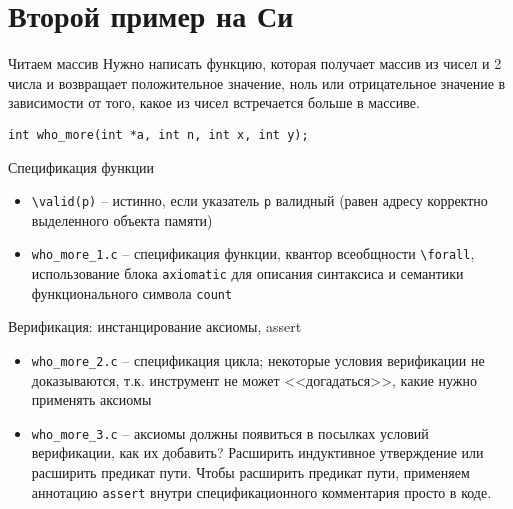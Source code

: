 \documentclass[hyperref={unicode=true}]{beamer}
\begin{document}
    \section{Второй пример на Си}
    \begin{frame}{Читаем массив}
    Нужно написать функцию, которая получает массив из чисел и 2 числа и возвращает положительное значение, ноль или отрицательное значение в зависимости от того, какое из чисел встречается больше в массиве.

    \texttt{int who\_more(int *a, int n, int x, int y);}
    \end{frame}

    \begin{frame}{Спецификация функции}
    \begin{itemize}
    \item \texttt{\textbackslash valid(p)} -- истинно, если указатель \texttt{p} валидный (равен адресу корректно выделенного объекта памяти)
    \item \texttt{who\_more\_1.c} -- спецификация функции, квантор всеобщности \texttt{\textbackslash forall}, использование блока \texttt{axiomatic} для описания синтаксиса и семантики функционального символа \texttt{count}
    \end{itemize}
    \end{frame}

    \begin{frame}{Верификация: инстанцирование аксиомы, assert}
    \begin{itemize}
    \item \texttt{who\_more\_2.c} -- спецификация цикла; некоторые условия верификации не доказываются, т.к. инструмент не может <<догадаться>>, какие нужно применять аксиомы
    \item \texttt{who\_more\_3.c} -- аксиомы должны появиться в посылках условий верификации, как их добавить? Расширить индуктивное утверждение или расширить предикат пути. Чтобы расширить предикат пути, применяем аннотацию \texttt{assert} внутри спецификационного комментария просто в коде.
    \end{itemize}
    \end{frame}
\end{document}
